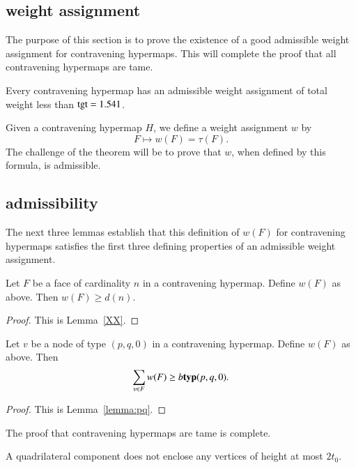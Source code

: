 \subsection{weight assignment}
    \label{sec:weight}

The purpose of this section is to prove the existence of a good
admissible weight assignment for contravening hypermaps.
This will complete the proof that all contravening
hypermaps are tame.

\begin{theorem}  Every contravening hypermap has an admissible
weight assignment of total weight less than ${\operatorname{tgt}}=1.541$.
\end{theorem}

Given a contravening hypermap $H$, we
define a weight assignment $w$ by
    $$F \mapsto w(F) = \tau(F).$$
The challenge of the theorem will be to prove that $w$, when
defined by this formula, is admissible.

\subsection{admissibility}
\label{sec:admissibility}

The next three lemmas establish that this definition of $w(F)$ for contravening hypermaps satisfies the first three defining
properties of an admissible weight assignment.

\begin{lemma}  Let $F$ be a face of cardinality $n$ in a contravening hypermap.
Define $w(F)$ as above. Then
        $w(F) \ge d(n)$.
\end{lemma}

\begin{proof} This is Lemma~\ref{XX}. %
\end{proof}

\begin{lemma} Let $v$ be a node of type $(p,q,0)$ in a contravening hypermap.  Define $w(F)$ as above. Then
        $$\sum_{v\in F} w(F) \ge b{{\operatorname{\bf typ}}{(p,q,0)}}.$$
\end{lemma}


\begin{proof} This is Lemma~\ref{lemma:pq}.
\end{proof}



The proof that contravening hypermaps are tame is complete.




\begin{lemma}\label{lemma:enclosed:bis} %
A quadrilateral component does not enclose any vertices of height at
most $2t_0$.
\end{lemma}